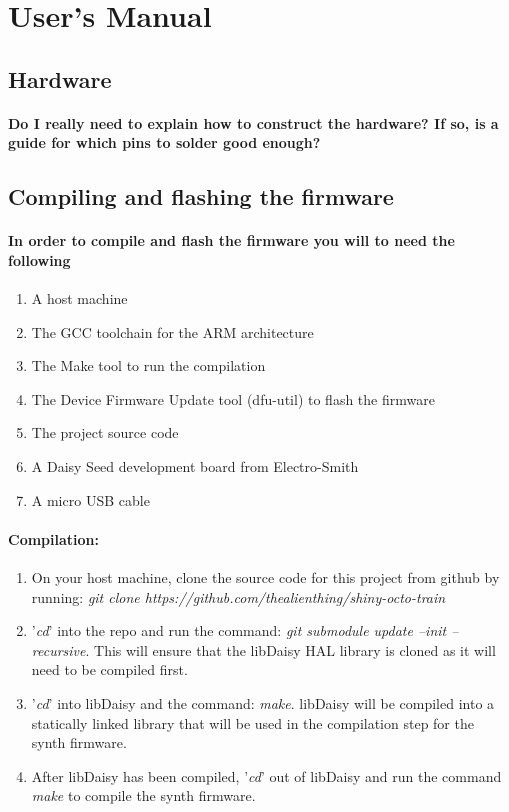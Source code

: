 \documentclass[acmlarge,screen]{acmart}
\begin{document}



\appendix

\section{User's Manual}
\subsection{Hardware}
\paragraph{Do I really need to explain how to construct the hardware? If so, is a guide for which pins to solder good enough?}
\subsection{Compiling and flashing the firmware}
\paragraph{In order to compile and flash the firmware you will to need the following}
\begin{enumerate}
	\item A host machine
	\item The GCC toolchain for the ARM architecture
	\item The Make tool to run the compilation
	\item The Device Firmware Update tool (dfu-util) to flash the firmware
	\item The project source code
	\item A Daisy Seed development board from Electro-Smith
	\item A micro USB cable
\end{enumerate}

\paragraph{Compilation:}
\begin{enumerate}
	\item On your host machine, clone the source code for this project from github by running: \textit{git clone https://github.com/thealienthing/shiny-octo-train}
	\item '\textit{cd}' into the repo and run the command: \textit{git submodule update --init --recursive}. This will ensure that the libDaisy HAL library is cloned as it will need to be compiled first.
	\item '\textit{cd}' into libDaisy and the command: \textit{make}. libDaisy will be compiled into a statically linked library that will be used in the compilation step for the synth firmware.
	\item After libDaisy has been compiled, '\textit{cd}' out of libDaisy and run the command \textit{make} to compile the synth firmware.
\end{enumerate}
\end{document}
